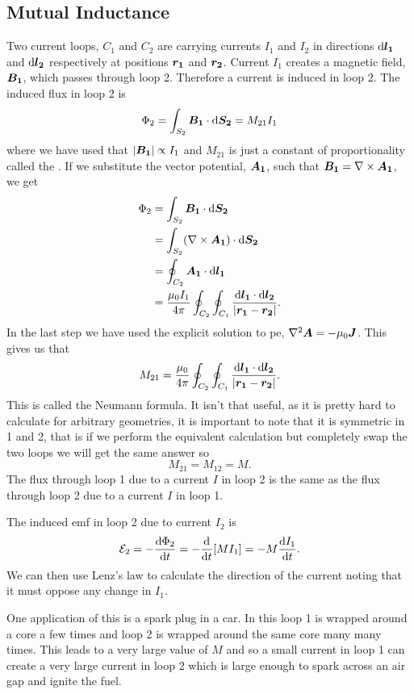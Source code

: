     \subsection{Mutual Inductance}
    Two current loops, \(C_1\) and \(C_2\) are carrying currents \(I_1\) and \(I_2\) in directions \(\dd{\bm{l_1}}\) and \(\dd{\bm{l_2}}\) respectively at positions \(\bm{r_1}\) and \(\bm{r_2}\).
    Current \(I_1\) creates a magnetic field, \(\bm{B_1}\), which passes through loop 2.
    Therefore a current is induced in loop 2.
    The induced flux in loop 2 is
    \[\Phi_2 = \int_{S_2}\bm{B_1}\cdot\dd{\bm{S_2}} = M_{21}I_1\]
    where we have used that \(\abs{\bm{B_1}}\propto I_1\) and \(M_{21}\) is just a constant of proportionality called the .
    If we substitute the vector potential, \(\bm{A_1}\), such that \(\bm{B_1} = \nabla\times\bm{A_1}\), we get
    \begin{align*}
        \Phi_2 &= \int_{S_2} \bm{B_1}\cdot\dd{\bm{S_2}}\\
        &= \int_{S_2} (\nabla\times\bm{A_1})\cdot\dd{\bm{S_2}}\\
        &= \oint_{C_2} \bm{A_1}\cdot\dd{\bm{l_1}}\\
        &= \frac{\mu_0 I_1}{4\pi} \oint_{C_2}\oint_{C_1} \frac{\dd{\bm{l_1}}\cdot\dd{\bm{l_2}}}{\abs{\bm{r_1} - \bm{r_2}}}.
    \end{align*}
    In the last step we have used the explicit solution to \gls{pe}, \(\nabla^2\bm{A} = -\mu_0\bm{J}\).
    This gives us that
    \[M_{21} = \frac{\mu_0}{4\pi}\oint_{C_2}\oint_{C_1} \frac{\dd{\bm{l_1}}\cdot\dd{\bm{l_2}}}{\abs{\bm{r_1} - \bm{r_2}}}.\]
    This is called the Neumann formula.
    It isn't that useful, as it is pretty hard to calculate for arbitrary geometries, it is important to note that it is symmetric in 1 and 2, that is if we perform the equivalent calculation but completely swap the two loops we will get the same answer so
    \[M_{21} = M_{12} = M.\]
    The flux through loop 1 due to a current \(I\) in loop 2 is the same as the flux through loop 2 due to a current \(I\) in loop 1.
    
    The induced \gls{emf} in loop 2 due to current \(I_2\) is
    \[\mathcal{E}_2 = -\dv{\Phi_2}{t} = -\dv{t}[MI_1] = -M\dv{I_1}{t}.\]
    We can then use Lenz's law to calculate the direction of the current noting that it must oppose any change in \(I_1\).
    
    One application of this is a spark plug in a car.
    In this loop 1 is wrapped around a core a few times and loop 2 is wrapped around the same core many many times.
    This leads to a very large value of \(M\) and so a small current in loop 1 can create a very large current in loop 2 which is large enough to spark across an air gap and ignite the fuel.
    
